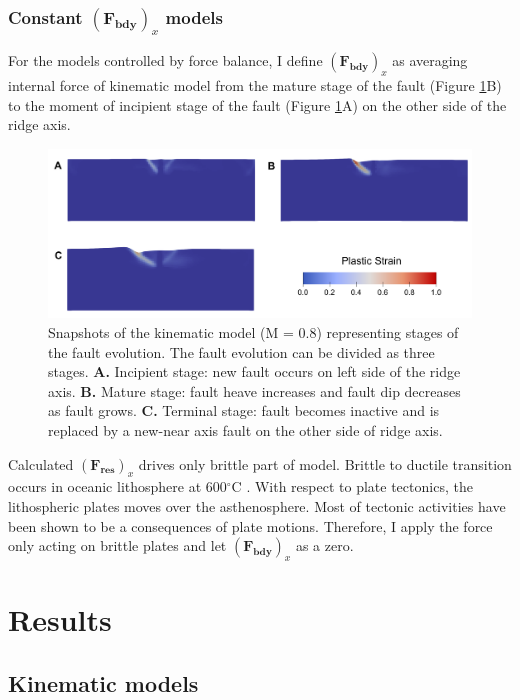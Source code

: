 \documentclass[letterpaper,12pt,notitle]{memphisthesis}                     %
\begin{document}
\subsection{Constant $(\boldsymbol{F_{bdy}})_x$ models}

For the models controlled by force balance, I define $(\boldsymbol{F_{bdy}})_x$ as averaging internal force of kinematic model from the mature stage of the fault (Figure \ref{fig:faultstage}B) to the moment of incipient stage of the fault  (Figure \ref{fig:faultstage}A) on the other side of the ridge axis.
%
\begin{figure}[!htb]
	\centering
	\includegraphics[width=0.9\linewidth]{./figs/fault_stage.pdf}
	\caption{ Snapshots of the kinematic model (M = 0.8) representing stages of the fault evolution. The fault evolution can be divided as three stages. \textbf{A.} Incipient stage: new fault occurs on left side of the ridge axis. \textbf{B.} Mature stage: fault heave increases and fault dip decreases as fault grows. \textbf{C.} Terminal stage: fault becomes inactive and is replaced by a new-near axis fault on the other side of ridge axis.}
	\label{fig:faultstage}
\end{figure}

Calculated $(\boldsymbol{F_{res}})_x$ drives only brittle part of model. Brittle to ductile transition occurs in oceanic lithosphere at 600$^\circ$C \citep{Violay2012}. With respect to plate tectonics, the lithospheric plates moves over the asthenosphere. Most of tectonic activities have been shown to be a consequences of plate motions. Therefore, I apply the force only acting on brittle plates and let $(\boldsymbol{F_{bdy}})_x$ as a zero.

\chapter{Results}

\section{Kinematic models}
\end{document}
